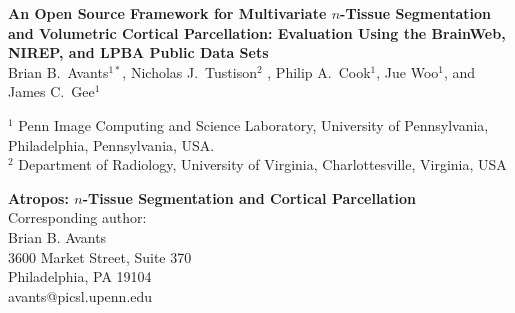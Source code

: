 \documentclass[11pt,english]{article}
\begin{document}
\normalem

\vspace*{5cm}

\begin{center}
{\Large \bf An Open Source Framework for Multivariate $n$-Tissue Segmentation and Volumetric Cortical Parcellation:  Evaluation Using the BrainWeb, NIREP, and LPBA Public Data Sets} \\
\vspace*{0.5cm}
{\normalsize Brian B.~Avants$^{1*}$,  Nicholas J.~Tustison$^2$%
, 
Philip A.~Cook$^1$, Jue Woo$^1$, and James C.~Gee$^1$} \\
\begin{singlespace} 
{\scriptsize  $^1$ Penn Image Computing and Science Laboratory, University of Pennsylvania, Philadelphia, Pennsylvania,  USA.\\
  $^2$ Department of Radiology, University of Virginia, Charlottesville, Virginia, USA}
\end{singlespace}
\end{center}

\vfill

\begin{singlespace} 
\scriptsize
\flushleft
{\bf Atropos:  $n$-Tissue Segmentation and Cortical Parcellation}\\
Corresponding author: \\
Brian B. Avants\\
3600 Market Street, Suite 370\\
Philadelphia, PA  19104\\
avants@picsl.upenn.edu\\
\end{singlespace} 

%
%

\clearpage
\end{document}
